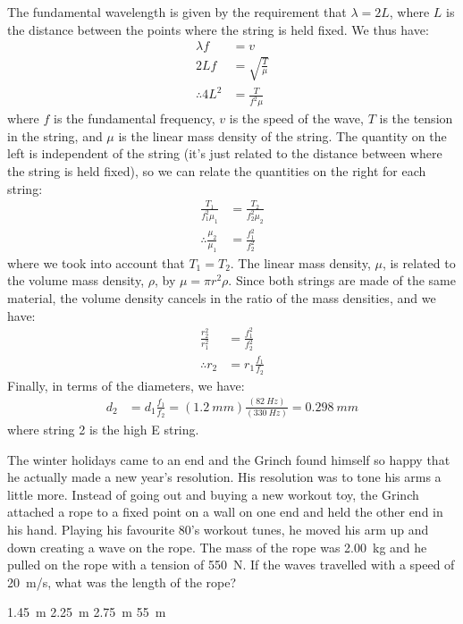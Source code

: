 \begin{solution}
The fundamental wavelength is given by the requirement that $\lambda=2L$, where $L$ is the distance between the points where the string is held fixed. We thus have:
\begin{align*}
\lambda f&=v\\
2L f&=\sqrt{\frac{T}{\mu}}\\
\therefore 4L^2&=\frac{T}{f^2\mu}
\end{align*}
where $f$ is the fundamental frequency, $v$ is the speed of the wave, $T$ is the tension in the string, and $\mu$ is the linear mass density of the string. The quantity on the left is independent of the string (it's just related to the distance between where the string is held fixed), so we can relate the quantities on the right for each string:
\begin{align*}
\frac{T_1}{f^2_1\mu_1} &=\frac{T_2}{f_2^2\mu_2}\\
\therefore \frac{\mu_2}{\mu_1}&=\frac{f_1^2}{f_2^2}
\end{align*}
where we took into account that $T_1=T_2$. The linear mass density, $\mu$, is related to the volume mass density, $\rho$, by $\mu=\pi r^2 \rho$. Since both strings are made of the same material, the volume density cancels in the ratio of the mass densities, and we have:
\begin{align*}
\frac{r_2^2}{r_1^2}&=\frac{f_1^2}{f_2^2}\\
\therefore r_2&=r_1\frac{f_1}{f_2}
\end{align*}
Finally, in terms of the diameters, we have:
\begin{align*}
d_2&=d_1\frac{f_1}{f_2}=(\SI{1.2}{mm})\frac{(\SI{82}{Hz})}{(\SI{330}{Hz})}=\SI{0.298}{mm}
\end{align*}
where string 2 is the high E string.
\end{solution}

\question The winter holidays came to an end and the Grinch found himself so happy that he actually made a new year's resolution. His resolution was to tone his arms a little more. Instead of going out and buying a new workout toy, the Grinch attached a rope to a fixed point on a wall on one end and held the other end in his hand. Playing his favourite 80's workout tunes, he moved his arm up and down creating a wave on the rope. The mass of the rope was \SI{2.00}{kg} and he pulled on the rope with a tension of \SI{550}{N}. If the waves travelled with a speed of \SI{20}{m/s}, what was the length of the rope?
\begin{choices} 
\CorrectChoice \SI{1.45}{m} \correct
\choice \SI{2.25}{m}
\choice \SI{2.75}{m} 
\choice \SI{55}{m}
\end{choices}

